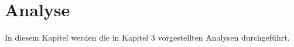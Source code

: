 \chapter{Analyse}
In diesem Kapitel werden die in Kapitel 3 vorgestellten Analysen durchgeführt.

\section{}